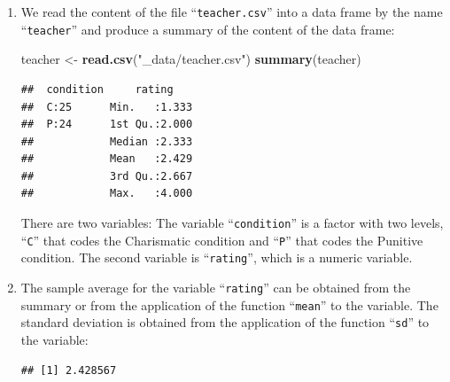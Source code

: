 \documentclass[
]{krantz}
\makeatletter
\newenvironment{Shaded}{\begin{snugshade}}{\end{snugshade}}
\newcommand{\KeywordTok}[1]{\textcolor[rgb]{0.13,0.29,0.53}{\textbf{#1}}}
\newcommand{\NormalTok}[1]{#1}
\newcommand{\OperatorTok}[1]{\textcolor[rgb]{0.81,0.36,0.00}{\textbf{#1}}}
\newcommand{\StringTok}[1]{\textcolor[rgb]{0.31,0.60,0.02}{#1}}
\newenvironment{kframe}{%
\medskip{}
\setlength{\fboxsep}{.8em}
 \def\at@end@of@kframe{}%
 \ifinner\ifhmode%
  \def\at@end@of@kframe{\end{minipage}}%
  \begin{minipage}{\columnwidth}%
 \fi\fi%
 \def\FrameCommand##1{\hskip\@totalleftmargin \hskip-\fboxsep
 \colorbox{shadecolor}{##1}\hskip-\fboxsep
     \hskip-\linewidth \hskip-\@totalleftmargin \hskip\columnwidth}%
 \MakeFramed {\advance\hsize-\width
   \@totalleftmargin\z@ \linewidth\hsize
   \@setminipage}}%
 {\par\unskip\endMakeFramed%
 \at@end@of@kframe}
\renewenvironment{Shaded}{\begin{kframe}}{\end{kframe}}
\theoremstyle{definition}
\theoremstyle{definition}
\theoremstyle{definition}
\theoremstyle{remark}
\makeatother
\begin{document}
\begin{enumerate}
\def\labelenumi{\arabic{enumi}.}
\item
  We read the content of the file
  ``\texttt{teacher.csv}'' into a data frame by the name ``\texttt{teacher}'' and produce a
  summary of the content of the data frame:

\begin{Shaded}
\begin{Highlighting}[]
\NormalTok{teacher <-}\StringTok{ }\KeywordTok{read.csv}\NormalTok{(}\StringTok{"_data/teacher.csv"}\NormalTok{)}
\KeywordTok{summary}\NormalTok{(teacher)}
\end{Highlighting}
\end{Shaded}

\begin{verbatim}
##  condition     rating     
##  C:25      Min.   :1.333  
##  P:24      1st Qu.:2.000  
##            Median :2.333  
##            Mean   :2.429  
##            3rd Qu.:2.667  
##            Max.   :4.000
\end{verbatim}

  There are two variables: The variable ``\texttt{condition}'' is a factor with two
  levels, ``\texttt{C}'' that codes the Charismatic condition and ``\texttt{P}'' that codes
  the Punitive condition. The second variable is ``\texttt{rating}'', which is a
  numeric variable.
\item
  The sample average for the
  variable ``\texttt{rating}'' can be obtained from the summary or from the
  application of the function ``\texttt{mean}'' to the variable. The standard
  deviation is obtained from the application of the function ``\texttt{sd}'' to the
  variable:

\begin{Shaded}
\end{Shaded}

\begin{verbatim}
## [1] 2.428567
\end{verbatim}

\begin{Shaded}
\end{Shaded}


\end{enumerate}
\end{document}
